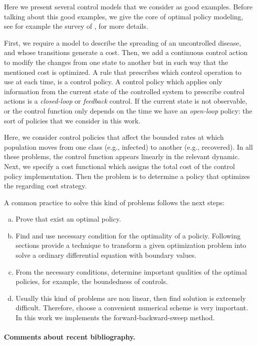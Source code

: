   Here we present  several control models that we consider as good 
examples. Before talking about this good examples, we give the core of optimal 
policy modeling, see for example the survey of \citet{Wickwire1977}, for more
details.

  First, we require a model to describe the spreading of an uncontrolled
disease, and whose transitions generate a cost. Then, we add a continuous
control action to modify the changes from one state to another but in such way
that the mentioned cost is optimized. A rule that prescribes which control
operation to use at each time, is a control policy. A control policy which
applies only information from the current state of the controlled system to
prescribe control actions is a \emph{closed-loop} or \emph{feedback} control.
If the current state is not observable, or the control function only depends 
on the time we have an \emph{open-loop} policy: the sort of policies that we 
consider in this work.

  Here, we consider control policies that affect the bounded rates at which
population moves from one class (e.g., infected) to another (e.g., recovered).
In all these problems, the control function appears linearly in the relevant
dynamic. Next, we specify a cost functional which assigns the total cost of the
control policy implementation. Then the problem is to determine a policy that
optimizes the regarding cost strategy.

  A common practice to solve this kind of problems follows the next steps:
  \begin{enumerate}[(a)]
    \item
      Prove that exist an optimal policy.
    \item 
      Find and use necessary condition for the optimality of a policiy.
      Following sections provide a technique to transform a given optimization
      problem into solve a ordinary differential equation with boundary values.
    \item 
      From the necessary conditions, determine important qualities of the 
      optimal policies, for example, the boundedness of controls.
    \item 
      Usually this kind of problems are non linear, then find solution is 
      extremely difficult. Therefore, choose a convenient numerical scheme is
      very important. In this work we implements the forward-backward-sweep 
      method.
  \end{enumerate}
\paragraph{Comments about recent bibliography.}
